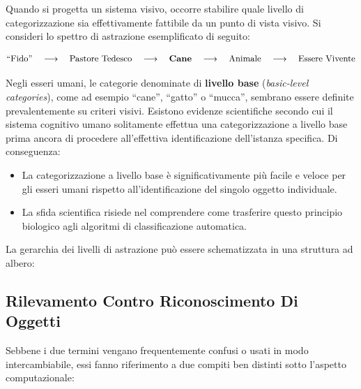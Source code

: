﻿\documentclass[11pt, a4paper]{article}
\begin{document}
Quando si progetta un sistema visivo, occorre stabilire quale livello di categorizzazione sia effettivamente fattibile da un punto di vista visivo. Si consideri lo spettro di astrazione esemplificato di seguito:

\[
\text{``Fido''} \quad \longrightarrow \quad \text{Pastore Tedesco} \quad \longrightarrow \quad \text{\textbf{Cane}} \quad \longrightarrow \quad \text{Animale} \quad \longrightarrow \quad \text{Essere Vivente}
\]


Negli esseri umani, le categorie denominate di \textbf{livello base} (\emph{basic-level categories}), come ad esempio ``cane'', ``gatto'' o ``mucca'', sembrano essere definite prevalentemente su criteri visivi. Esistono evidenze scientifiche secondo cui il sistema cognitivo umano solitamente effettua una categorizzazione a livello base prima ancora di procedere all'effettiva identificazione dell'istanza specifica.
Di conseguenza:
\begin{itemize}
    \item La categorizzazione a livello base è significativamente più facile e veloce per gli esseri umani rispetto all'identificazione del singolo oggetto individuale.
    \item La sfida scientifica risiede nel comprendere come trasferire questo principio biologico agli algoritmi di classificazione automatica.
\end{itemize}

La gerarchia dei livelli di astrazione può essere schematizzata in una struttura ad albero:


\subsection{Rilevamento Contro Riconoscimento Di Oggetti}

Sebbene i due termini vengano frequentemente confusi o usati in modo intercambiabile, essi fanno riferimento a due compiti ben distinti sotto l'aspetto computazionale:
\end{document}
